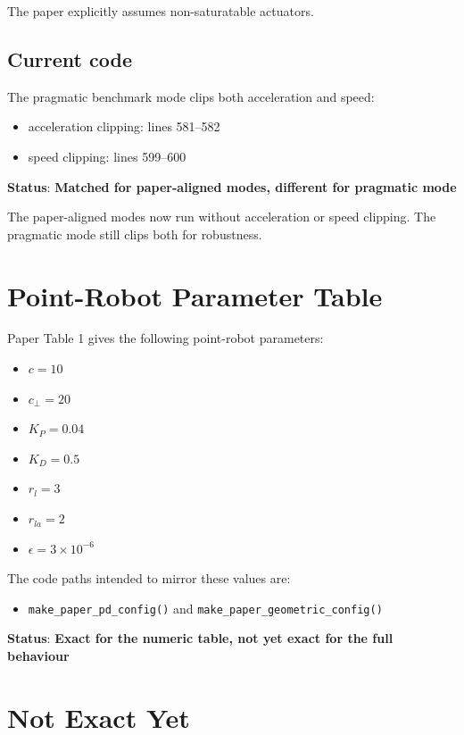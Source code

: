 \documentclass[11pt]{article}
\begin{document}
The paper explicitly assumes non-saturatable actuators.

\subsection*{Current code}

The pragmatic benchmark mode clips both acceleration and speed:

\begin{itemize}[leftmargin=*]
  \item acceleration clipping: lines 581--582
  \item speed clipping: lines 599--600
\end{itemize}

\textbf{Status}: \textbf{Matched for paper-aligned modes, different for pragmatic mode}

The paper-aligned modes now run without acceleration or speed clipping. The
pragmatic mode still clips both for robustness.

\section*{Point-Robot Parameter Table}

Paper Table 1 gives the following point-robot parameters:

\begin{itemize}[leftmargin=*]
  \item \(c = 10\)
  \item \(c_{\perp} = 20\)
  \item \(K_P = 0.04\)
  \item \(K_D = 0.5\)
  \item \(r_l = 3\)
  \item \(r_{la} = 2\)
  \item \(\epsilon = 3 \times 10^{-6}\)
\end{itemize}

The code paths intended to mirror these values are:

\begin{itemize}[leftmargin=*]
  \item \texttt{make\_paper\_pd\_config()} and \texttt{make\_paper\_geometric\_config()}
\end{itemize}

\textbf{Status}: \textbf{Exact for the numeric table, not yet exact for the full behaviour}

\section*{Not Exact Yet}
\end{document}
